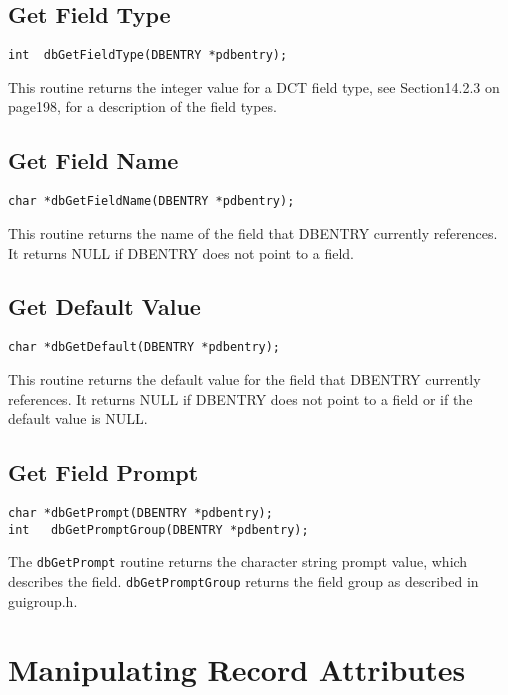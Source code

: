 \subsection{Get Field Type}

\begin{verbatim}int  dbGetFieldType(DBENTRY *pdbentry);
\end{verbatim}This routine returns the integer value for a DCT field type, see Section14.2.3 on page198, for a description of the field 
types.

\subsection{Get Field Name}

\begin{verbatim}char *dbGetFieldName(DBENTRY *pdbentry);
\end{verbatim}This routine returns the name of the field that DBENTRY currently references. It returns NULL if DBENTRY does not 
point to a field.

\subsection{Get Default Value}

\begin{verbatim}char *dbGetDefault(DBENTRY *pdbentry);
\end{verbatim}This routine returns the default value for the field that DBENTRY currently references. It returns NULL if DBENTRY 
does not point to a field or if the default value is NULL.

\subsection{Get Field Prompt}

\begin{verbatim}char *dbGetPrompt(DBENTRY *pdbentry);
int   dbGetPromptGroup(DBENTRY *pdbentry); 
\end{verbatim}
The \verb|dbGetPrompt| routine returns the character string prompt value, which describes the field. \verb|dbGetPromptGroup| 
returns the field group as described in guigroup.h.

\section{Manipulating Record Attributes}

